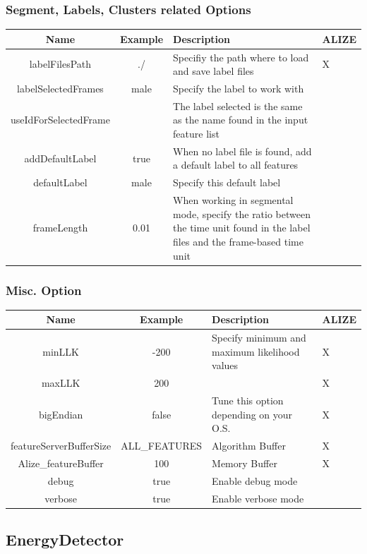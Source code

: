 \documentclass[a4paper]{article}
\begin{document}
\subsubsection{Segment, Labels, Clusters related Options}
\begin{tabular}{|c|c||p{8cm}|p{0.8cm}|}
\hline Name & Example & Description & ALIZE\\
\hline
\hline labelFilesPath & ./ & Specifiy the path where to load and save label files & X\\
\hline labelSelectedFrames & male & Specify the label to work with&\\
\hline useIdForSelectedFrame & & The label selected is the same as the name found in the input feature list&\\
\hline addDefaultLabel & true & When no label file is found, add a default label to all features&\\
\hline defaultLabel & male & Specify this default label&\\
\hline frameLength & 0.01 & When working in segmental mode, specify the ratio between the time unit found in the label files and the frame-based time unit&\\
\hline
\end{tabular}

\subsubsection{Misc. Option}
\begin{tabular}{|c|c||p{8cm}|p{0.8cm}|}
\hline Name & Example & Description & ALIZE\\
\hline
\hline minLLK & -200 & Specify minimum and maximum likelihood values & X\\
\cline{1-2} maxLLK & 200 &  & X\\
\hline bigEndian & false & Tune this option depending on your O.S. & X\\
\hline featureServerBufferSize  & ALL\_FEATURES & Algorithm Buffer & X\\
\hline Alize\_featureBuffer & 100 & Memory Buffer & X\\
\hline debug & true & Enable debug mode & \\
\hline verbose & true & Enable verbose mode & \\
\hline
\end{tabular}

\subsection{EnergyDetector}
\end{document}
